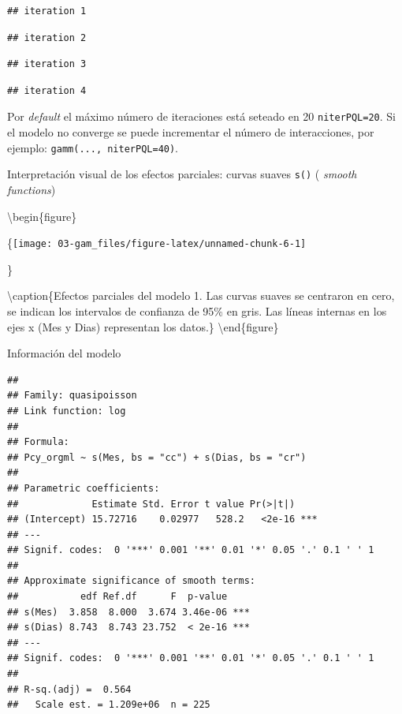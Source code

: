 \documentclass[
]{book}
\newenvironment{Shaded}{\begin{snugshade}}{\end{snugshade}}
\newcommand{\AttributeTok}[1]{\textcolor[rgb]{0.77,0.63,0.00}{#1}}
\newcommand{\DecValTok}[1]{\textcolor[rgb]{0.00,0.00,0.81}{#1}}
\newcommand{\FunctionTok}[1]{\textcolor[rgb]{0.00,0.00,0.00}{#1}}
\newcommand{\NormalTok}[1]{#1}
\newcommand{\SpecialCharTok}[1]{\textcolor[rgb]{0.00,0.00,0.00}{#1}}
\begin{document}
\begin{verbatim}
## iteration 1
\end{verbatim}

\begin{verbatim}
## iteration 2
\end{verbatim}

\begin{verbatim}
## iteration 3
\end{verbatim}

\begin{verbatim}
## iteration 4
\end{verbatim}

Por \emph{default} el máximo número de iteraciones está seteado en 20 \texttt{niterPQL=20}. Si el modelo no converge se puede incrementar el número de interacciones, por ejemplo: \texttt{gamm(...,\ niterPQL=40)}.

Interpretación visual de los efectos parciales: curvas suaves \texttt{s()} ( \emph{smooth functions})

\begin{Shaded}
\end{Shaded}

\textbackslash begin\{figure\}

\{\centering \texttt{[image: 03-gam\_files/figure-latex/unnamed-chunk-6-1]}

\}

\textbackslash caption\{Efectos parciales del modelo 1. Las curvas suaves se centraron en cero, se indican los intervalos de confianza de 95\% en gris. Las líneas internas en los ejes x (Mes y Dias) representan los datos.\}\label{fig:unnamed-chunk-6}
\textbackslash end\{figure\}

Información del modelo

\begin{Shaded}
\end{Shaded}

\begin{verbatim}
## 
## Family: quasipoisson 
## Link function: log 
## 
## Formula:
## Pcy_orgml ~ s(Mes, bs = "cc") + s(Dias, bs = "cr")
## 
## Parametric coefficients:
##             Estimate Std. Error t value Pr(>|t|)    
## (Intercept) 15.72716    0.02977   528.2   <2e-16 ***
## ---
## Signif. codes:  0 '***' 0.001 '**' 0.01 '*' 0.05 '.' 0.1 ' ' 1
## 
## Approximate significance of smooth terms:
##           edf Ref.df      F  p-value    
## s(Mes)  3.858  8.000  3.674 3.46e-06 ***
## s(Dias) 8.743  8.743 23.752  < 2e-16 ***
## ---
## Signif. codes:  0 '***' 0.001 '**' 0.01 '*' 0.05 '.' 0.1 ' ' 1
## 
## R-sq.(adj) =  0.564   
##   Scale est. = 1.209e+06  n = 225
\end{verbatim}
\end{document}
